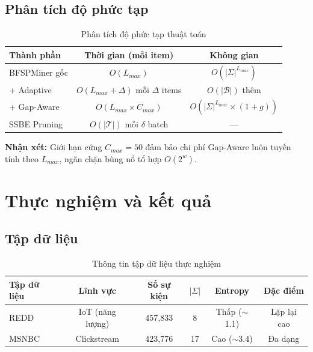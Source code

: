 \documentclass[a4paper,12pt]{report}
\begin{document}
\section{Phân tích độ phức tạp}

\begin{table}[H]
    \centering
    \caption{Phân tích độ phức tạp thuật toán}
    \label{tab:complexity}
    \begin{tabular}{lcc}
        \toprule
        \textbf{Thành phần} & \textbf{Thời gian (mỗi item)} & \textbf{Không gian} \\
        \midrule
        BFSPMiner gốc      & $O(L_{max})$                    & $O(|\Sigma|^{L_{max}})$ \\
        + Adaptive          & $O(L_{max} + \Delta)$ mỗi $\Delta$ items & $O(|\mathcal{B}|)$ thêm \\
        + Gap-Aware         & $O(L_{max} \times C_{max})$     & $O(|\Sigma|^{L_{max}} \times (1+g))$ \\
        SSBE Pruning        & $O(|\mathcal{T}|)$ mỗi $\delta$ batch & --- \\
        \bottomrule
    \end{tabular}
\end{table}

\textbf{Nhận xét:} Giới hạn cứng $C_{max} = 50$ đảm bảo chi phí Gap-Aware luôn tuyến tính theo $L_{max}$, ngăn chặn bùng nổ tổ hợp $O(2^w)$.

\chapter{Thực nghiệm và kết quả}
\label{chap:experiments}

\section{Tập dữ liệu}

\begin{table}[H]
    \centering
    \caption{Thông tin tập dữ liệu thực nghiệm}
    \label{tab:datasets}
    \begin{tabular}{lccccc}
        \toprule
        \textbf{Tập dữ liệu} & \textbf{Lĩnh vực} & \textbf{Số sự kiện} & \textbf{$|\Sigma|$} & \textbf{Entropy} & \textbf{Đặc điểm} \\
        \midrule
        REDD \cite{kolter2011} & IoT (năng lượng) & 457,833 & 8  & Thấp ($\sim$1.1) & Lặp lại cao \\
        MSNBC \cite{msnbc2000} & Clickstream      & 423,776 & 17 & Cao ($\sim$3.4)  & Đa dạng \\
        \bottomrule
    \end{tabular}
\end{table}
\end{document}
